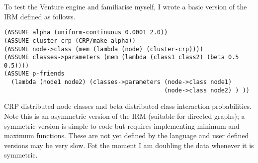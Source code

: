 \documentclass[twoside,11pt]{article}
\begin{document}
To test the Venture engine and familiarise myself, I wrote a basic version of the IRM \citep{Kemp2006} defined as follows.
%
\begin{lstlisting}[frame=single]
(ASSUME alpha (uniform-continuous 0.0001 2.0))
(ASSUME cluster-crp (CRP/make alpha))
(ASSUME node->class (mem (lambda (node) (cluster-crp))))
(ASSUME classes->parameters (mem (lambda (class1 class2) (beta 0.5 0.5)))) 
(ASSUME p-friends 
  (lambda (node1 node2) (classes->parameters (node->class node1) 
                                             (node->class node2) ) )) 
\end{lstlisting}
%
\ie CRP distributed node classes and beta distributed class interaction probabilities.
Note this is an asymmetric version of the IRM (\eg suitable for directed graphs); a symmetric version is simple to code but requires implementing minimum and maximum functions.
These are not yet defined by the language and user defined versions may be very slow.
Fot the moment I am doubling the data whenever it is symmetric.
\end{document}
